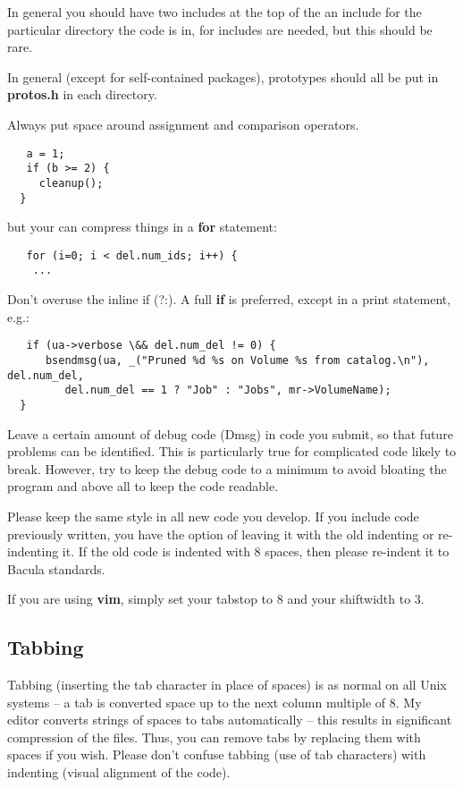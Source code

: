 In general you should have two includes at the top of the an include for the
particular directory the code is in, for includes are needed, but this should
be rare.

In general (except for self-contained packages), prototypes should all be put
in {\bf protos.h} in each directory.

Always put space around assignment and comparison operators.

\footnotesize
\begin{verbatim}
   a = 1;
   if (b >= 2) {
     cleanup();
  }
\end{verbatim}
\normalsize

but your can compress things in a {\bf for} statement:

\footnotesize
\begin{verbatim}
   for (i=0; i < del.num_ids; i++) {
    ...
\end{verbatim}
\normalsize

Don't overuse the inline if (?:). A full {\bf if} is preferred, except in a
print statement, e.g.:

\footnotesize
\begin{verbatim}
   if (ua->verbose \&& del.num_del != 0) {
      bsendmsg(ua, _("Pruned %d %s on Volume %s from catalog.\n"), del.num_del,
         del.num_del == 1 ? "Job" : "Jobs", mr->VolumeName);
  }
\end{verbatim}
\normalsize

Leave a certain amount of debug code (Dmsg) in code you submit, so that future
problems can be identified. This is particularly true for complicated code
likely to break. However, try to keep the debug code to a minimum to avoid
bloating the program and above all to keep the code readable.

Please keep the same style in all new code you develop. If you include code
previously written, you have the option of leaving it with the old indenting
or re-indenting it. If the old code is indented with 8 spaces, then please
re-indent it to Bacula standards.

If you are using {\bf vim}, simply set your tabstop to 8 and your shiftwidth
to 3.

\subsection{Tabbing}

Tabbing (inserting the tab character in place of spaces) is as normal on all
Unix systems -- a tab is converted space up to the next column multiple of 8.
My editor converts strings of spaces to tabs automatically -- this results in
significant compression of the files. Thus, you can remove tabs by replacing
them with spaces if you wish. Please don't confuse tabbing (use of tab
characters) with indenting (visual alignment of the code).

